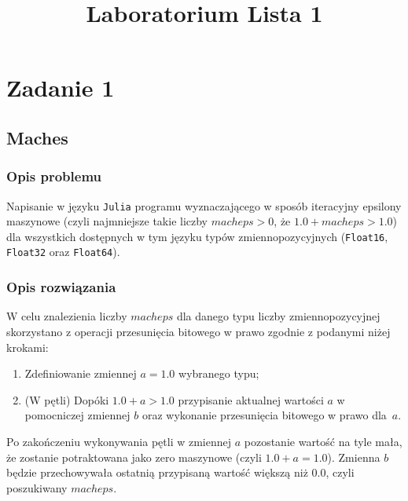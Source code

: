 \documentclass{classrep}
\author{
  \studentinfo{Agata Jasionowska}{229726}
}
\title{Laboratorium \ppauza Lista 1}
\begin{document}
\maketitle

\section{Zadanie 1}
	\subsection{Maches}
		\subsubsection{Opis problemu}
			Napisanie w języku \texttt{Julia} programu wyznaczającego w sposób iteracyjny epsilony 
			maszynowe (czyli najmniejsze takie liczby $macheps > 0$, że $1.0 + macheps > 1.0$) 
			dla wszystkich dostępnych w tym języku typów zmiennopozycyjnych (\texttt{Float16},
			\texttt{Float32} oraz \texttt{Float64}).
		\subsubsection{Opis rozwiązania}
			W celu znalezienia liczby $macheps$ dla danego typu liczby zmiennopozycyjnej
			skorzystano	z operacji przesunięcia bitowego w prawo zgodnie z podanymi niżej krokami:
			\begin{enumerate}
				\item Zdefiniowanie zmiennej $a = 1.0$ wybranego typu;
				\item (W pętli) Dopóki $1.0 + a > 1.0$ przypisanie aktualnej wartości $a$ w pomocniczej 
				zmiennej $b$ oraz wykonanie przesunięcia bitowego w prawo dla~$a$.
			\end{enumerate}
			Po zakończeniu wykonywania pętli w zmiennej $a$ pozostanie wartość na tyle
			mała, że zostanie potraktowana jako zero maszynowe (czyli $1.0 + a = 1.0$). Zmienna
			$b$ będzie przechowywała ostatnią przypisaną wartość większą niż $0.0$, czyli 
			poszukiwany $macheps$.
\end{document}

